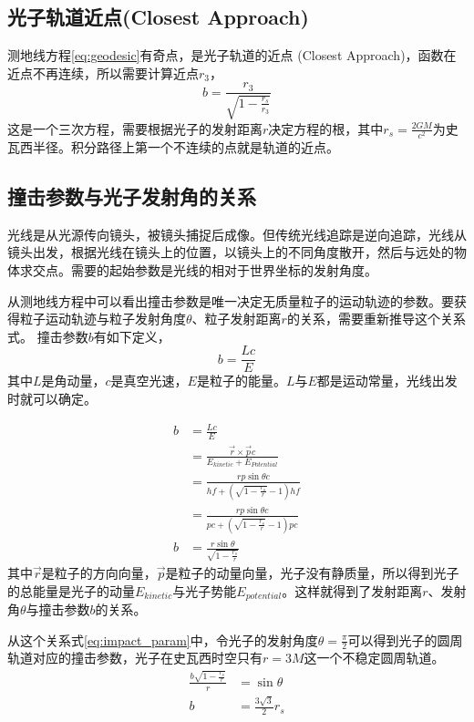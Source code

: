 \subsection{光子轨道近点(Closest Approach)}
测地线方程\eqref{eq:geodesic}有奇点，是光子轨道的近点 (Closest Approach)，函数在近点不再连续，所以需要计算近点$r_3$，
\begin{equation}
    b=\frac{r_3}{\sqrt{1-\frac{r_s}{r_3}}}\label{eq:r3}
\end{equation}
这是一个三次方程，需要根据光子的发射距离$r$决定方程的根，其中$r_s=\frac{2GM}{c^2}$为史瓦西半径。积分路径上第一个不连续的点就是轨道的近点。

\subsection{撞击参数与光子发射角的关系}
光线是从光源传向镜头，被镜头捕捉后成像。但传统光线追踪是逆向追踪，光线从镜头出发，根据光线在镜头上的位置，以镜头上的不同角度散开，然后与远处的物体求交点。需要的起始参数是光线的相对于世界坐标的发射角度。

从测地线方程中可以看出撞击参数是唯一决定无质量粒子的运动轨迹的参数。要获得粒子运动轨迹与粒子发射角度$\theta$、粒子发射距离$r$的关系，需要重新推导这个关系式。
撞击参数$b$有如下定义，
\begin{equation}
    b=\frac{Lc}{E}
\end{equation}
其中$L$是角动量，$c$是真空光速，$E$是粒子的能量。$L$与$E$都是运动常量，光线出发时就可以确定。

\begin{equation}
    \begin{split}
        b&=\frac{Lc}{E}\\&=\frac{\vec{r}\times\vec{p}c}{E_{kinetic}+E_{Potential}}\\&=\frac{rp\sin\theta c}{hf+\left(\sqrt{1-\frac{r_{s}}{r}}-1\right)hf}\\&=\frac{rp\sin\theta c}{pc+\left(\sqrt{1-\frac{r_{s}}{r}}-1\right)pc}\\b&=\frac{r\sin\theta}{\sqrt{1-\frac{r_{s}}{r}}}\label{eq:impact_param}
    \end{split}
\end{equation}
其中$\vec{r}$是粒子的方向向量，$\vec{p}$是粒子的动量向量，光子没有静质量，所以得到光子的总能量是光子的动量$E_{kinetic}$与光子势能$E_{potential}$。这样就得到了发射距离$r$、发射角$\theta$与撞击参数$b$的关系。

从这个关系式\eqref{eq:impact_param}中，令光子的发射角度$\theta=\frac{\pi}{2}$可以得到光子的圆周轨道对应的撞击参数，光子在史瓦西时空只有$r=3M$这一个不稳定圆周轨道。
\begin{equation}
    \begin{split}
        \frac{b\sqrt{1-\frac{r_{s}}{r}}}{r}&=\sin\theta\\
        b&=\frac{3\sqrt{3}}{2}r_{s}\label{eq:circular_orbit}
    \end{split}
\end{equation}


